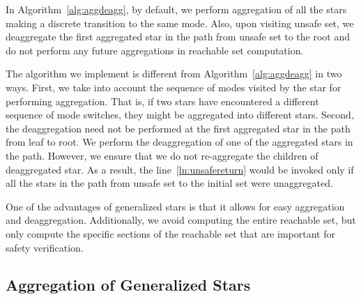 \begin{remark}
\label{rem:aggonly}
In Algorithm~\ref{alg:aggdeagg}, by default, we perform aggregation of all the stars making a discrete transition to the same mode. Also, upon visiting unsafe set, we deaggregate the first aggregated star in the path from unsafe set to the root and do not perform any future aggregations in reachable set computation. 

The algorithm we implement is different from Algorithm~\ref{alg:aggdeagg} in two ways. First, we take into account the sequence of modes visited by the star for performing aggregation. That is, if two stars have encountered a different sequence of mode switches, they might be aggregated into different stars. Second, the deaggregation need not be performed at the first aggregated star in the path from leaf to root. We perform the deaggregation of one of the aggregated stars in the path. However, we ensure that we do not re-aggregate the children of deaggregated star. As a result, the line~\ref{ln:unsafereturn} would be invoked only if all the stars in the path from unsafe set to the initial set were unaggregated.
\end{remark}

One of the advantages of generalized stars is that it allows for easy aggregation and deaggregation. 
%
Additionally, we avoid computing the entire reachable set, but only compute the specific sections of the reachable set that are important for safety verification.
%
%
%
%




\subsection{Aggregation of Generalized Stars}
\label{sec:aggStars}

